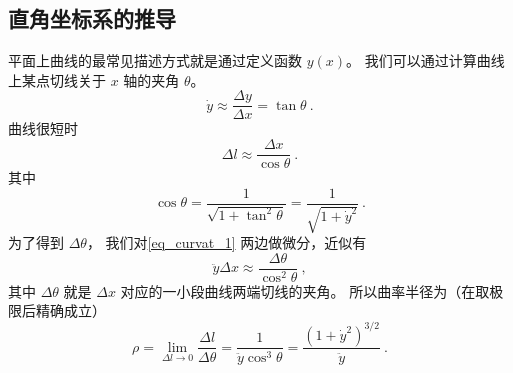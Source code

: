 \subsection{直角坐标系的推导}
平面上曲线的最常见描述方式就是通过定义函数 $y(x)$。 我们可以通过计算曲线上某点切线关于 $x$ 轴的夹角 $\theta$。
\begin{equation}\label{eq_curvat_1}
\dot y \approx \frac{\Delta y}{\Delta x} = \tan \theta~.
\end{equation}
曲线很短时
\begin{equation}
\Delta{l} \approx \frac{\Delta{x}}{\cos\theta}~.
\end{equation}
其中
\begin{equation}\label{eq_curvat_2}
\cos\theta = \frac{1}{\sqrt{1 + \tan^2\theta}} = \frac{1}{\sqrt{1 + \dot y^2}}~.
\end{equation}
为了得到 $\Delta{\theta}$， 我们对\autoref{eq_curvat_1} 两边做微分，近似有
\begin{equation}
\ddot y \Delta{x} \approx \frac{\Delta{\theta}}{\cos^2\theta}~,
\end{equation}
其中 $\Delta{\theta}$ 就是 $\Delta{x}$ 对应的一小段曲线两端切线的夹角。 所以曲率半径为（在取极限后精确成立）
\begin{equation}
\rho = \lim_{\Delta l\to 0}\frac{\Delta l}{\Delta \theta} = \frac{1}{\ddot y\cos^3\theta} = \frac{(1 + \dot y^2)^{3/2}}{\ddot y}~.
\end{equation}

